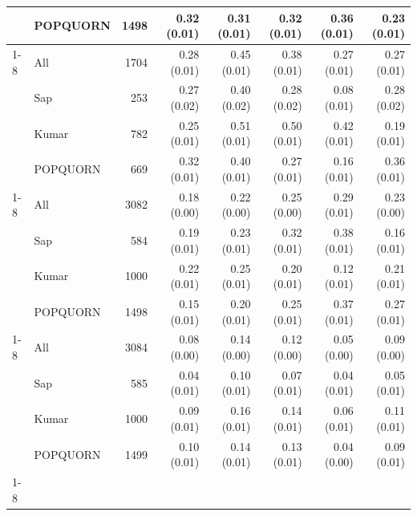 \begin{table}[t]
\begin{tabular}{llrrrrrr}
 & POPQUORN & 1498 & 0.32 (0.01) & 0.31 (0.01) & 0.32 (0.01) & 0.36 (0.01) & 0.23 (0.01) \\
\cline{1-8}
\multirow[t]{4}{*}{Mistral 24B} & All & 1704 & 0.28 (0.01) & 0.45 (0.01) & 0.38 (0.01) & 0.27 (0.01) & 0.27 (0.01) \\
 & Sap & 253 & 0.27 (0.02) & 0.40 (0.02) & 0.28 (0.02) & 0.08 (0.01) & 0.28 (0.02) \\
 & Kumar & 782 & 0.25 (0.01) & 0.51 (0.01) & 0.50 (0.01) & 0.42 (0.01) & 0.19 (0.01) \\
 & POPQUORN & 669 & 0.32 (0.01) & 0.40 (0.01) & 0.27 (0.01) & 0.16 (0.01) & 0.36 (0.01) \\
\cline{1-8}
\multirow[t]{4}{*}{Gemma 5B} & All & 3082 & 0.18 (0.00) & 0.22 (0.00) & 0.25 (0.00) & 0.29 (0.01) & 0.23 (0.00) \\
 & Sap & 584 & 0.19 (0.01) & 0.23 (0.01) & 0.32 (0.01) & 0.38 (0.01) & 0.16 (0.01) \\
 & Kumar & 1000 & 0.22 (0.01) & 0.25 (0.01) & 0.20 (0.01) & 0.12 (0.01) & 0.21 (0.01) \\
 & POPQUORN & 1498 & 0.15 (0.01) & 0.20 (0.01) & 0.25 (0.01) & 0.37 (0.01) & 0.27 (0.01) \\
\cline{1-8}
\multirow[t]{4}{*}{Gemma 31B} & All & 3084 & 0.08 (0.00) & 0.14 (0.00) & 0.12 (0.00) & 0.05 (0.00) & 0.09 (0.00) \\
 & Sap & 585 & 0.04 (0.01) & 0.10 (0.01) & 0.07 (0.01) & 0.04 (0.01) & 0.05 (0.01) \\
 & Kumar & 1000 & 0.09 (0.01) & 0.16 (0.01) & 0.14 (0.01) & 0.06 (0.01) & 0.11 (0.01) \\
 & POPQUORN & 1499 & 0.10 (0.01) & 0.14 (0.01) & 0.13 (0.01) & 0.04 (0.00) & 0.09 (0.01) \\
\cline{1-8}
\bottomrule
\end{tabular}
\end{table}
